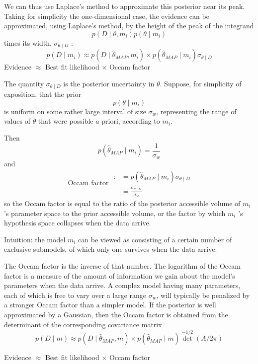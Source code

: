 \documentclass[11pt]{article}
\theoremstyle{plain} %
\theoremstyle{remark}
\begin{document}
We can thus use Laplace's method to approximate this posterior near its
  peak. Taking for simplicity the one-dimensional case, the evidence can be
  approximated, using Laplace's method, by the height of the peak of the
  integrand
$$
p\left(D \mid \theta, m_{i}\right) p\left(\theta \mid m_{i}\right)
$$
times its width, $\sigma_{\theta \mid D}$ :
$$
p\left(D \mid m_{i}\right) \approx p\left(D \mid \hat{\theta}_{M A P}, m_{i}\right) \times p\left(\hat{\theta}_{M A P} \mid m_{i}\right) \sigma_{\theta \mid D}
$$
Evidence $\approx$ Best fit likelihood $\times$ Occam factor

The quantity $\sigma_{\theta \mid D}$ is the posterior uncertainty in
  $\theta$. Suppose, for simplicity of exposition, that the prior
$$
p\left(\theta \mid m_{i}\right)
$$
is uniform on some rather large interval of size $\sigma_{w}$, representing the
range of values of $\theta$ that were possible $a$ priori, according to $m_{i}$.

Then 
$$
p\left(\hat{\theta}_{M A P} \mid m_{i}\right)=\frac{1}{\sigma_{w}}
$$
and
$$
\text { Occam factor } \begin{aligned}
: & =p\left(\hat{\theta}_{M A P} \mid m_{i}\right) \sigma_{\theta \mid D} \\
& =\frac{\sigma_{\theta \mid D}}{\sigma_{w}}
\end{aligned}
$$
so the Occam factor is equal to the ratio of the posterior accessible volume of
$m_{i}$ 's parameter space to the prior accessible volume, or the factor by
which $m_{i}$ 's hypothesis space collapses when the data arrive.

Intuition: the model $m_{i}$ can be viewed as consisting of a certain
  number of exclusive submodels, of which only one survives when the data
  arrive.

  The Occam factor is the inverse of that number. The logarithm of the Occam factor is a measure of the amount of
  information we gain about the model's parameters when the data arrive. A complex model having many parameters, each of which is free to vary
  over a large range $\sigma_{w}$, will typically be penalized by a stronger
  Occam factor than a simpler model. If the posterior is well approximated by a Gaussian, then the Occam
  factor is obtained from the determinant of the corresponding covariance matrix
$$
p(D \mid m) \approx p\left(D \mid \hat{\theta}_{M A P}, m\right) \times p\left(\hat{\theta}_{M A P} \mid m\right) \operatorname{det}^{-1 / 2}(A / 2 \pi)
$$

Evidence $\approx$ Best fit likelihood $\times$ Occam factor
\end{document}
